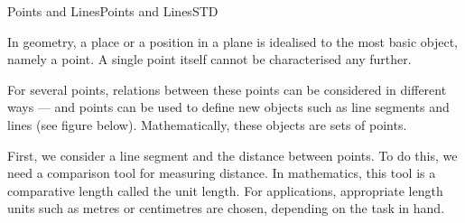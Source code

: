 \begin{MXContent}{Points and Lines}{Points and Lines}{STD}

In geometry, a place or a position in a plane is idealised to the 
most basic object, namely a point. A single point itself cannot be characterised any further. 

For several points, relations between these points can be considered in different ways --- 
and points can be used to define new objects such as line segments and lines (see figure below).
Mathematically, these objects are sets of points.

\begin{center}
\end{center}

First, we consider a line segment and the distance between points. To do this, 
we need a comparison tool for measuring distance. In mathematics,
this tool is a comparative length called the unit length. For applications, 
appropriate length units such as metres or centimetres are chosen, depending 
on the task in hand.


\end{MXContent}
